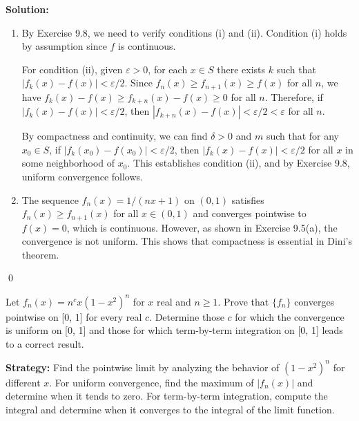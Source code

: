 \bigskip\noindent\textbf{Solution:}
\begin{enumerate}[label=(\alph*)]
\item By Exercise 9.8, we need to verify conditions (i) and (ii). Condition (i) holds by assumption since \( f \) is continuous.

For condition (ii), given \( \varepsilon > 0 \), for each \( x \in S \) there exists \( k \) such that \( |f_k(x) - f(x)| < \varepsilon/2 \). Since \( f_n(x) \geq f_{n+1}(x) \geq f(x) \) for all \( n \), we have \( f_k(x) - f(x) \geq f_{k+n}(x) - f(x) \geq 0 \) for all \( n \). Therefore, if \( |f_k(x) - f(x)| < \varepsilon/2 \), then \( |f_{k+n}(x) - f(x)| < \varepsilon/2 < \varepsilon \) for all \( n \).

By compactness and continuity, we can find \( \delta > 0 \) and \( m \) such that for any \( x_0 \in S \), if \( |f_k(x_0) - f(x_0)| < \varepsilon/2 \), then \( |f_k(x) - f(x)| < \varepsilon/2 \) for all \( x \) in some neighborhood of \( x_0 \). This establishes condition (ii), and by Exercise 9.8, uniform convergence follows.

\item The sequence \( f_n(x) = 1/(nx + 1) \) on \( (0, 1) \) satisfies \( f_n(x) \geq f_{n+1}(x) \) for all \( x \in (0, 1) \) and converges pointwise to \( f(x) = 0 \), which is continuous. However, as shown in Exercise 9.5(a), the convergence is not uniform. This shows that compactness is essential in Dini's theorem.
\end{enumerate}\qed


\begin{problembox}
\begin{problemstatement}
Let \( f_n(x) = n^c x(1 - x^2)^n \) for \( x \) real and \( n \geq 1 \). Prove that \( \{f_n\} \) converges pointwise on [0, 1] for every real \( c \). Determine those \( c \) for which the convergence is uniform on [0, 1] and those for which term-by-term integration on [0, 1] leads to a correct result.
\end{problemstatement}
\end{problembox}

\noindent\textbf{Strategy:} Find the pointwise limit by analyzing the behavior of \( (1 - x^2)^n \) for different \( x \). For uniform convergence, find the maximum of \( |f_n(x)| \) and determine when it tends to zero. For term-by-term integration, compute the integral and determine when it converges to the integral of the limit function.

